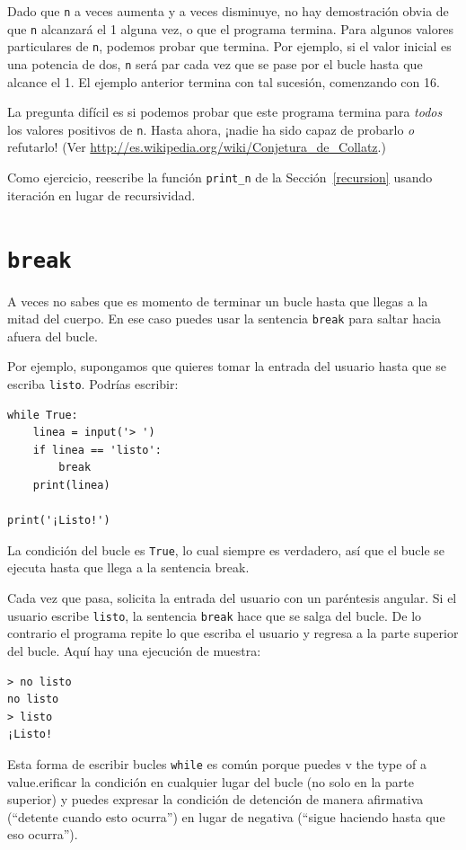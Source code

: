 \documentclass[10pt]{book}
\begin{document}
Dado que {\tt n} a veces aumenta y a veces disminuye, no hay
demostración obvia de que {\tt n} alcanzará el 1 alguna vez, o que el programa
termina.  Para algunos valores particulares de {\tt n}, podemos probar que
termina.  Por ejemplo, si el valor inicial es una potencia de dos,
{\tt n} será par cada vez que se pase por el bucle
hasta que alcance el 1. El ejemplo anterior termina con tal sucesión,
comenzando con 16.

La pregunta difícil es si podemos probar que este programa termina
para {\em todos} los valores positivos de {\tt n}.  Hasta ahora, ¡nadie ha
sido capaz de probarlo {\em o} refutarlo!  (Ver
  \url{http://es.wikipedia.org/wiki/Conjetura_de_Collatz}.)

Como ejercicio, reescribe la función \verb"print_n" de la
Sección~\ref{recursion} usando iteración en lugar de recursividad.


\section{{\tt break}}

A veces no sabes que es momento de terminar un bucle hasta que llegas a la mitad
del cuerpo.  En ese caso puedes usar la sentencia {\tt break}
para saltar hacia afuera del bucle.

Por ejemplo, supongamos que quieres tomar la entrada del usuario hasta que
se escriba {\tt listo}.    Podrías escribir:

\begin{verbatim}
while True:
    linea = input('> ')
    if linea == 'listo':
        break
    print(linea)

print('¡Listo!')
\end{verbatim}
%
La condición del bucle es {\tt True}, lo cual siempre es verdadero, así que el
bucle se ejecuta hasta que llega a la sentencia break.

Cada vez que pasa, solicita la entrada del usuario con un paréntesis angular.
Si el usuario escribe {\tt listo}, la sentencia {\tt break} hace que se salga
del bucle.  De lo contrario el programa repite lo que escriba el usuario
y regresa a la parte superior del bucle.  Aquí hay una ejecución de muestra:

\begin{verbatim}
> no listo
no listo
> listo
¡Listo!
\end{verbatim}
%
Esta forma de escribir bucles {\tt while} es común porque puedes
v the type of a value.erificar la condición en cualquier lugar del bucle (no solo en la
parte superior) y puedes expresar la condición de detención de manera afirmativa
(``detente cuando esto ocurra'') en lugar de negativa (``sigue haciendo
hasta que eso ocurra'').
\end{document}
